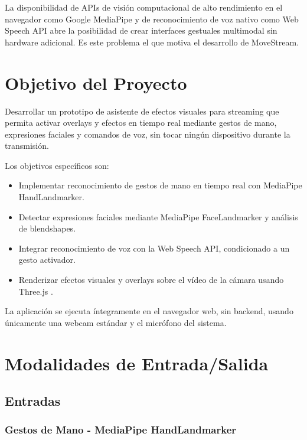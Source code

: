 \documentclass[11pt]{article}
\begin{document}
La disponibilidad de APIs de visión computacional de alto rendimiento en el navegador como Google MediaPipe \cite{mediapipe} y de reconocimiento de voz nativo como Web Speech API \cite{webspeech} abre la posibilidad de crear interfaces gestuales multimodal sin hardware adicional. Es este problema el que motiva el desarrollo de MoveStream.

\section{Objetivo del Proyecto}

Desarrollar un prototipo de asistente de efectos visuales para streaming que permita activar overlays y efectos en tiempo real mediante gestos de mano, expresiones faciales y comandos de voz, sin tocar ningún dispositivo durante la transmisión.

Los objetivos específicos son:
\begin{itemize}
    \item Implementar reconocimiento de gestos de mano en tiempo real con MediaPipe HandLandmarker.
    \item Detectar expresiones faciales mediante MediaPipe FaceLandmarker y análisis de blendshapes.
    \item Integrar reconocimiento de voz con la Web Speech API, condicionado a un gesto activador.
    \item Renderizar efectos visuales y overlays sobre el vídeo de la cámara usando Three.js \cite{threejs}.
\end{itemize}

La aplicación se ejecuta íntegramente en el navegador web, sin backend, usando únicamente una webcam estándar y el micrófono del sistema.

\section{Modalidades de Entrada/Salida}

\subsection{Entradas}

\subsubsection{Gestos de Mano - MediaPipe HandLandmarker}
\end{document}
